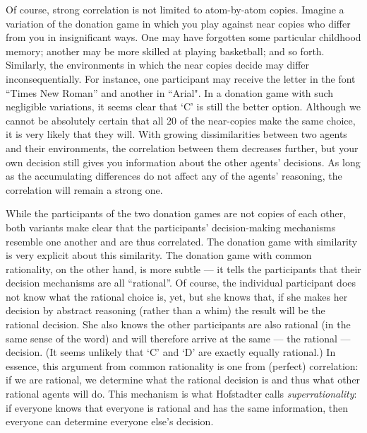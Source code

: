 \documentclass{book}
\begin{document}
Of course, strong correlation is not limited to atom-by-atom copies. Imagine a variation of the donation game in which you play against near copies who differ from you in insignificant ways. One may have forgotten some particular childhood memory; another may be more skilled at playing basketball; and so forth. Similarly, the environments in which the near copies decide may differ inconsequentially. For instance, one participant may receive the letter in the font “Times New Roman” and another in “Arial". In a donation game with such negligible variations, it seems clear that ‘C’ is still the better option. Although we cannot be absolutely certain that all 20 of the near-copies make the same choice, it is very likely that they will. With growing dissimilarities between two agents and their environments, the correlation between them decreases further, but your own decision still gives you information about the other agents’ decisions. As long as the accumulating differences do not affect any of the agents’ reasoning, the correlation will remain a strong one.
 
While the participants of the two donation games are not copies of each other, both variants make clear that the participants’ decision-making mechanisms resemble one another and are thus correlated. The donation game with similarity is very explicit about this similarity. The donation game with common rationality, on the other hand, is more subtle --- it tells the participants that their decision mechanisms are all “rational”. Of course, the individual participant does not know what the rational choice is, yet, but she knows that, if she makes her decision by abstract reasoning (rather than a whim) the result will be the rational decision. She also knows the other participants are also rational (in the same sense of the word) and will therefore arrive at the same --- the rational --- decision. (It seems unlikely that ‘C’ and ‘D’ are exactly equally rational.) In essence, this argument from common rationality is one from (perfect) correlation: if we are rational, we determine what the rational decision is and thus what other rational agents will do. This mechanism is what Hofstadter calls \textit{superrationality}: if everyone knows that everyone is rational and has the same information, then everyone can determine everyone else’s decision.
\end{document}
